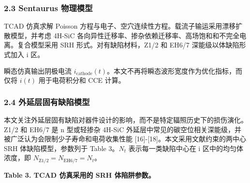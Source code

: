 \documentclass[
  10pt,
  a4paper,
]{ctexart}
\begin{document}
\subsubsection{2.3 Sentaurus
物理模型}\label{sentaurus-ux7269ux7406ux6a21ux578b}

TCAD 仿真求解 Poisson
方程与电子、空穴连续性方程。载流子输运采用漂移扩散模型，并考虑 4H-SiC
各向异性迁移率、掺杂依赖迁移率、高场饱和和不完全电离。复合模型采用 SRH
形式。对有缺陷材料，Z1/2 和 EH6/7 深能级以体缺陷形式加入 i 区。

瞬态仿真输出阴极电流
\(i_{\mathrm{cathode}}(t)\)。本文不再将瞬态波形宽度作为优化指标，而仅将
\(i(t)\) 用于电荷积分和 CCE 计算。

\subsubsection{2.4
外延层固有缺陷模型}\label{ux5916ux5ef6ux5c42ux56faux6709ux7f3aux9677ux6a21ux578b}

本文关注外延层固有缺陷对器件设计的影响，而不是特定辐照历史下的损伤演化。Z1/2
和 EH6/7 是 n 型或轻掺杂 4H-SiC
外延层中常见的碳空位相关深能级，并被广泛认为会限制少子寿命和电荷收集性能
{[}16{]}-{[}18{]}。本文采用文献约束的两中心 SRH 体缺陷模型，参数列于
Table 3。\(N_t\) 表示每一类缺陷中心在 i 区中的均匀体浓度，即
\(N_{\mathrm{Z1/2}}=N_{\mathrm{EH6/7}}=N_t\)。

\textbf{Table 3. TCAD 仿真采用的 SRH 体陷阱参数。}
\end{document}
